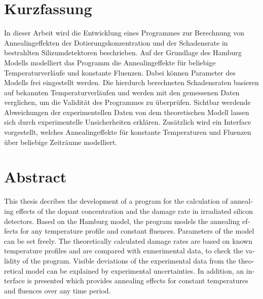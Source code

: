 \thispagestyle{plain}

\section*{Kurzfassung}
In dieser Arbeit wird die Entwicklung eines Programmes zur
Berechnung von Annealingeffekten der Dotierungskonzentration und der Schadensrate in bestrahlten
Silizumdetektoren
beschrieben. Auf der Grundlage des Hamburg Modells modelliert das Programm die Annealingeffekte für beliebige
Temperaturverläufe und konstante Fluenzen.
Dabei können Parameter des Modells frei eingestellt werden.
Die hierdurch berechneten Schadensraten basieren auf bekannten Temperaturverläufen und werden mit den gemessenen Daten verglichen,
um die Validität des Programmes zu überprüfen. Sichtbar werdende Abweichungen der
experimentellen Daten von dem theoretischen Modell lassen sich durch experimentelle Unsicherheiten erklären.
Zusätzlich wird ein Interface vorgestellt, welches Annealingeffekte für konstante Temperaturen und Fluenzen
über beliebige Zeiträume modelliert.

\section*{Abstract}
\begin{english}
  This thesis decribes the development of a program for the
calculation of annealing effects of the dopant concentration and the damage rate in irradiated
silicon detectors.
 Based on the Hamburg model, the program models the annealing effects for any
temperature profile and constant fluences.
  Parameters of the model can be set freely.
  The theoretically calculated damage rates are based on known temperature profiles and are compared with exmerimental data,
  to check the validity of the program.
   Visible deviations of the experimental data from the theoretical model can be explained by experimental uncertainties. In addition, an interface
   is presented which provides annealing effects for constant temperatures and fluences over any time period.



\end{english}

